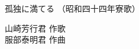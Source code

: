 \documentclass[10pt,b5j]{tarticle} %
\begin{document}
\begin{minipage}[c]{0.7\hsize} %
    \begin{center}
        {\LARGE
            孤独に満てる %
        }
        {\small 
            （昭和四十四年寮歌） %
        }
    \end{center}
\end{minipage}
\begin{minipage}[c]{0.3\hsize} %
    \begin{flushright} %
        山崎芳行君 作歌\\服部泰明君 作曲 %
    \end{flushright}
\end{minipage}
\end{document}
